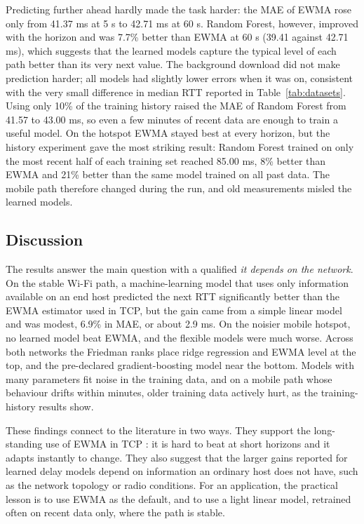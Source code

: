 \documentclass[pdflatex,sn-mathphys-num]{sn-jnl}
\begin{document}
Predicting further ahead hardly made the task harder: the MAE of EWMA rose only from 41.37 ms at 5 s to 42.71 ms at 60 s. Random Forest, however, improved with the horizon and was 7.7\% better than EWMA at 60 s (39.41 against 42.71 ms), which suggests that the learned models capture the typical level of each path better than its very next value. The background download did not make prediction harder; all models had slightly lower errors when it was on, consistent with the very small difference in median RTT reported in Table~\ref{tab:datasets}. Using only 10\% of the training history raised the MAE of Random Forest from 41.57 to 43.00 ms, so even a few minutes of recent data are enough to train a useful model. On the hotspot EWMA stayed best at every horizon, but the history experiment gave the most striking result: Random Forest trained on only the most recent half of each training set reached 85.00 ms, 8\% better than EWMA and 21\% better than the same model trained on all past data. The mobile path therefore changed during the run, and old measurements misled the learned models.

\subsection{Discussion}\label{sec:discussion}

The results answer the main question with a qualified \emph{it depends on the network}. On the stable Wi-Fi path, a machine-learning model that uses only information available on an end host predicted the next RTT significantly better than the EWMA estimator used in TCP, but the gain came from a simple linear model and was modest, 6.9\% in MAE, or about 2.9 ms. On the noisier mobile hotspot, no learned model beat EWMA, and the flexible models were much worse. Across both networks the Friedman ranks place ridge regression and EWMA level at the top, and the pre-declared gradient-boosting model near the bottom. Models with many parameters fit noise in the training data, and on a mobile path whose behaviour drifts within minutes, older training data actively hurt, as the training-history results show.

These findings connect to the literature in two ways. They support the long-standing use of EWMA in TCP \cite{jacobson1988,rfc6298}: it is hard to beat at short horizons and it adapts instantly to change. They also suggest that the larger gains reported for learned delay models \cite{rusek2020routenet,ferriol2023fermi,mostafavi2025delay} depend on information an ordinary host does not have, such as the network topology or radio conditions. For an application, the practical lesson is to use EWMA as the default, and to use a light linear model, retrained often on recent data only, where the path is stable.
\end{document}
